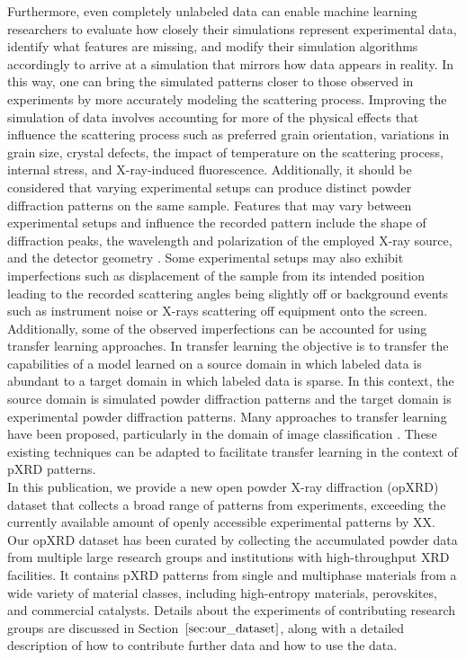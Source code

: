 Furthermore, even completely unlabeled data can enable machine learning researchers to evaluate how closely their simulations represent experimental data, identify what features are missing, and modify their simulation algorithms accordingly to arrive at a simulation that mirrors how data appears in reality. In this way, one can bring the simulated patterns closer to those observed in experiments by more accurately modeling the scattering process.
Improving the simulation of data involves accounting for more of the physical effects that influence the scattering process such as preferred grain orientation, variations in grain size, crystal defects, the impact of temperature on the scattering process, internal stress, and X-ray-induced fluorescence\cite{cao2024simxrd, Waseda2011, Pecharsky2023}.  Additionally, it should be considered that varying experimental setups can produce distinct powder diffraction patterns on the same sample. Features that may vary between experimental setups and influence the recorded pattern include the shape of diffraction peaks, the wavelength and polarization of the employed X-ray source, and the detector geometry
\cite{Waseda2011, Pecharsky2023}. Some experimental setups may also exhibit imperfections such as displacement of the sample from its intended position leading to the recorded scattering angles being slightly off \cite{hulbert2023} or background events such as instrument noise or X-rays scattering off equipment onto the screen.\\

Additionally, some of the observed imperfections can be accounted for using transfer learning approaches. In transfer learning the objective is to transfer the capabilities of a model learned on a source domain in which labeled data is abundant to a target domain in which labeled data is sparse\cite{Zhuang2021}. In this context, the source domain is simulated powder diffraction patterns and the target domain is experimental powder diffraction patterns. Many approaches to transfer learning have been proposed, particularly in the domain of image classification \cite{Gatys2016, Ganin2015}. These existing techniques can be adapted to facilitate transfer learning in the context of pXRD patterns.\\

In this publication, we provide a new open powder X-ray diffraction (opXRD) dataset that collects a broad range of patterns from experiments, exceeding the currently available amount of openly accessible experimental patterns by XX.
Our opXRD dataset has been curated by collecting the accumulated powder data from multiple large research groups and institutions with high-throughput XRD facilities. It contains pXRD patterns from single and multiphase materials from a wide variety of material classes, including 
high-entropy materials, perovskites, and commercial catalysts. Details about the experiments of contributing research groups are discussed in Section~$\eqref{sec:our_dataset}$, along with a detailed description of how to contribute further data and how to use the data. \\

